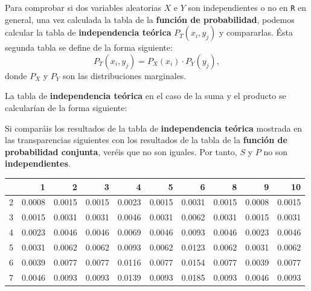 \documentclass[]{book}
\newenvironment{Shaded}{\begin{snugshade}}{\end{snugshade}}
\newcommand{\KeywordTok}[1]{\textcolor[rgb]{0.13,0.29,0.53}{\textbf{#1}}}
\newcommand{\NormalTok}[1]{#1}
\newcommand{\OperatorTok}[1]{\textcolor[rgb]{0.81,0.36,0.00}{\textbf{#1}}}
\newcommand{\StringTok}[1]{\textcolor[rgb]{0.31,0.60,0.02}{#1}}
\begin{document}
Para comprobar si dos variables aleatorias \(X\) e \(Y\) son independientes o no en \texttt{R} en general, una vez calculada la tabla de la \textbf{función de probabilidad}, podemos calcular la tabla de \textbf{independencia teórica} \(P_T(x_i,y_j)\) y compararlas. Ésta segunda tabla se define de la forma siguiente:
\[
P_T(x_i,y_j)=P_X(x_i)\cdot P_Y(y_j),
\]
donde \(P_X\) y \(P_Y\) son las distribuciones marginales.

La tabla de \textbf{independencia teórica } en el caso de la suma y el producto se calcularían de la forma siguiente:

\begin{Shaded}
\end{Shaded}

Si comparáis los resultados de la tabla de \textbf{independencia teórica} mostrada en las transparencias siguientes con los resultados de la tabla de la \textbf{función de probabilidad conjunta}, veréis que no son iguales. Por tanto, \(S\) y \(P\) no son \textbf{independientes}.

\begin{tabular}{l|r|r|r|r|r|r|r|r|r}
\hline
  & 1 & 2 & 3 & 4 & 5 & 6 & 8 & 9 & 10\\
\hline
2 & 0.0008 & 0.0015 & 0.0015 & 0.0023 & 0.0015 & 0.0031 & 0.0015 & 0.0008 & 0.0015\\
\hline
3 & 0.0015 & 0.0031 & 0.0031 & 0.0046 & 0.0031 & 0.0062 & 0.0031 & 0.0015 & 0.0031\\
\hline
4 & 0.0023 & 0.0046 & 0.0046 & 0.0069 & 0.0046 & 0.0093 & 0.0046 & 0.0023 & 0.0046\\
\hline
5 & 0.0031 & 0.0062 & 0.0062 & 0.0093 & 0.0062 & 0.0123 & 0.0062 & 0.0031 & 0.0062\\
\hline
6 & 0.0039 & 0.0077 & 0.0077 & 0.0116 & 0.0077 & 0.0154 & 0.0077 & 0.0039 & 0.0077\\
\hline
7 & 0.0046 & 0.0093 & 0.0093 & 0.0139 & 0.0093 & 0.0185 & 0.0093 & 0.0046 & 0.0093\\
\hline
\end{tabular}
\end{document}
